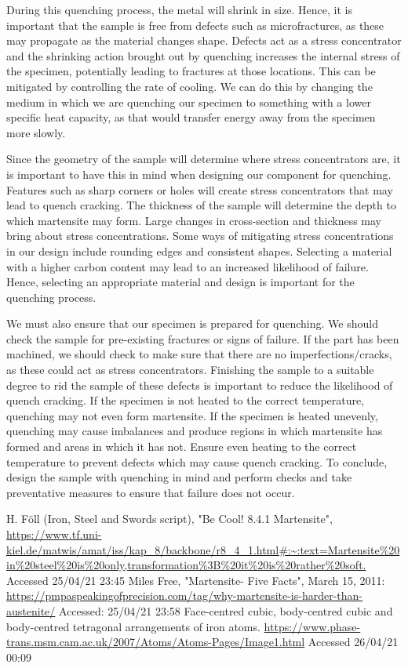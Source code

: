 \documentclass[11pt]{article}
\begin{document}
During this quenching process, the metal will shrink in size. Hence, it is important that the sample is free from defects such as microfractures, as these may propagate as the material changes shape. Defects act as a stress concentrator and the shrinking action brought out by quenching increases the internal stress of the specimen, potentially leading to fractures at those locations. This can be mitigated by controlling the rate of cooling. We can do this by changing the medium in which we are quenching our specimen to something with a lower specific heat capacity, as that would transfer energy away from the specimen more slowly. 

Since the geometry of the sample will determine where stress concentrators are, it is important to have this in mind when designing our component for quenching. Features such as sharp corners or holes will create stress concentrators that may lead to quench cracking. The thickness of the sample will determine the depth to which martensite may form. Large changes in cross-section and thickness may bring about stress concentrations. Some ways of mitigating stress concentrations in our design include rounding edges and consistent shapes. Selecting a material with a higher carbon content may lead to an increased likelihood of failure. Hence, selecting an appropriate material and design is important for the quenching process.

We must also ensure that our specimen is prepared for quenching. We should check the sample for pre-existing fractures or signs of failure. If the part has been machined, we should check to make sure that there are no imperfections/cracks, as these could act as stress concentrators. Finishing the sample to a suitable degree to rid the sample of these defects is important to reduce the likelihood of quench cracking. If the specimen is not heated to the correct temperature, quenching may not even form martensite. If the specimen is heated unevenly, quenching may cause imbalances and produce regions in which martensite has formed and areas in which it has not. Ensure even heating to the correct temperature to prevent defects which may cause quench cracking. To conclude, design the sample with quenching in mind and perform checks and take preventative measures to ensure that failure does not occur.
\begin{thebibliography}{00}
     H. Föll (Iron, Steel and Swords script), "Be Cool! 8.4.1 Martensite", \url{https://www.tf.uni-kiel.de/matwis/amat/iss/kap_8/backbone/r8_4_1.html#:~:text=Martensite%20in%20steel%20is%20only,transformation%3B%20it%20is%20rather%20soft.} Accessed 25/04/21 23:45
     Miles Free, "Martensite- Five Facts", March 15, 2011: \url{https://pmpaspeakingofprecision.com/tag/why-martensite-is-harder-than-austenite/} Accessed: 25/04/21 23:58
     Face-centred cubic, body-centred cubic and body-centred tetragonal arrangements of iron atoms. \url{https://www.phase-trans.msm.cam.ac.uk/2007/Atoms/Atoms-Pages/Image1.html} Accessed 26/04/21 00:09
\end{thebibliography}
\end{document}
